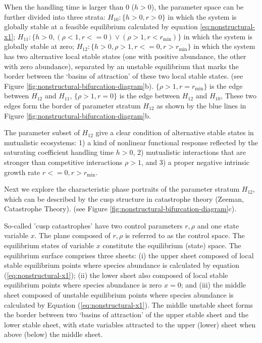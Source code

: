 \documentclass[a4paper,fleqn,12pt]{article}
\begin{document}
When the handling time is larger than 0 ($h > 0$), the parameter space can be further divided into three strata: %
$H_{10}:\{h > 0, r > 0\}$ in which the system is globally stable at a feasible equilibrium calculated by equation \ref{eq:nonstructural-x1};
$H_{11}:\{h > 0, (\rho < 1, r <= 0) \lor (\rho > 1, r < r_{\mathrm{min}}) \}$ in which the system is globally stable at zero;
$H_{12}:\{h > 0, \rho > 1, r <= 0,  r > r_{\mathrm{min}} \}$ in which the system has two alternative local stable states (one with positive abundance, the other with zero abundance), separated by an unstable equilibrium that marks the border between the `basins of attraction' of these two local stable states.
(see Figure \ref{fig:nonstructural-bifurcation-diagram}b).
$\{\rho > 1, r = r_{\mathrm{min}}\}$ is the edge between $H_{12}$ and $H_{11}$, $\{\rho > 1, r = 0\}$ is the edge between $H_{12}$ and $H_{10}$,
These two edges form the border of parameter stratum $H_{12}$  as shown by the blue lines in Figure \ref{fig:nonstructural-bifurcation-diagram}b.

The parameter subset of $H_{12}$ give a clear condition of alternative stable states in mutualistic ecosystems\cite{kefi_when_2016}: 
1) a kind of nonlinear functional response reflected by the saturating coefficient handling time $h>0$, 2) mutualistic interactions that are stronger than competitive interactions $\rho>1$, and 3) a proper negative intrinsic growth rate $r <= 0,  r > r_{\mathrm{min}}$.

Next we explore the characteristic phase portraits of the parameter stratum $H_{12}$,
which can be described by the cusp structure in catastrophe theory \cite{zeeman_catastrophe_1979} (Zeeman, Catastrophe Theory).
(see Figure \ref{fig:nonstructural-bifurcation-diagram}c).

So-called 'cusp catastrophes' have two control parameters $r, \rho$ and one state variable $x$.
The plane composed of $r, \rho$ is referred to as the control space.
The equilibrium states of variable $x$ constitute the equilibrium (state) space.
The equilibrium surface comprises three sheets: (i) the upper sheet composed of local stable equilibrium points where species abundance is calculated by equation (\ref{eq:nonstructural-x1}); (ii) the lower sheet also composed of local stable equilibrium points where species abundance is zero $x = 0$; and (iii) the middle sheet composed of unstable equilibrium points where species abundance is calculated by Equation (\ref{eq:nonstructural-x1}).
The middle unstable sheet forms the border between two `basins of attraction' of the upper stable sheet and the lower stable sheet, with state variables attracted to the upper (lower) sheet when above (below) the middle sheet.
\end{document}
